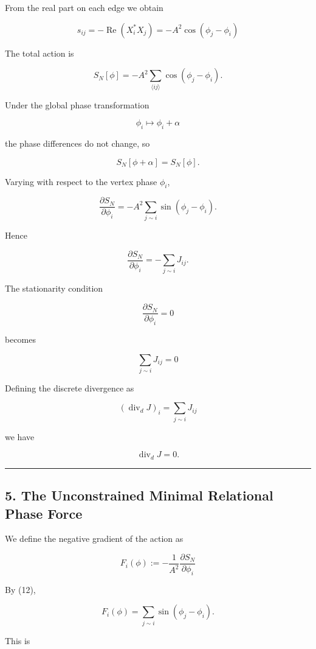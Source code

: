 \documentclass[
  a4paper,
]{article}
\begin{document}
From the real part on each edge we obtain

\[
s_{ij}
=
-\operatorname{Re}(X_i^*X_j)
=
-A^2\cos(\phi_j-\phi_i)
\tag{9}
\]

The total action is

\[
\boxed{
S_N[\phi]
=
-A^2
\sum_{\langle ij\rangle}
\cos(\phi_j-\phi_i).
}
\tag{10}
\]

Under the global phase transformation

\[
\phi_i\mapsto\phi_i+\alpha
\]

the phase differences do not change, so

\[
\boxed{
S_N[\phi+\alpha]=S_N[\phi].
}
\tag{11}
\]

Varying with respect to the vertex phase \(\phi_i\),

\[
\frac{\partial S_N}{\partial\phi_i}
=
-A^2
\sum_{j\sim i}
\sin(\phi_j-\phi_i).
\]

Hence

\[
\boxed{
\frac{\partial S_N}{\partial\phi_i}
=
-\sum_{j\sim i}J_{ij}.
}
\tag{12}
\]

The stationarity condition

\[
\frac{\partial S_N}{\partial\phi_i}=0
\]

becomes

\[
\boxed{
\sum_{j\sim i}J_{ij}=0
}
\tag{13}
\]

Defining the discrete divergence as

\[
\boxed{
(\operatorname{div}_dJ)_i
=
\sum_{j\sim i}J_{ij}
}
\tag{14}
\]

we have

\[
\boxed{
\operatorname{div}_dJ=0.
}
\tag{15}
\]

\begin{center}\rule{0.5\linewidth}{0.5pt}\end{center}

\subsection{5. The Unconstrained Minimal Relational Phase
Force}\label{the-unconstrained-minimal-relational-phase-force}

We define the negative gradient of the action as

\[
F_i(\phi)
:=
-\frac{1}{A^2}
\frac{\partial S_N}{\partial\phi_i}
\]

By (12),

\[
\boxed{
F_i(\phi)
=
\sum_{j\sim i}
\sin(\phi_j-\phi_i).
}
\tag{16}
\]

This is
\end{document}
